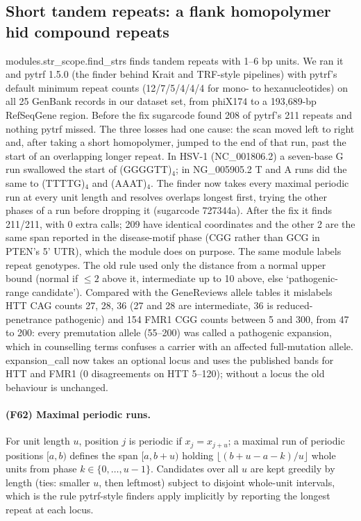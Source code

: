\subsection{Short tandem repeats: a flank homopolymer hid compound repeats}
modules.str\_scope.find\_strs finds tandem repeats with 1--6 bp units. We ran it and pytrf 1.5.0 (the finder behind Krait and TRF-style pipelines) with pytrf's default minimum repeat counts (12/7/5/4/4/4 for mono- to hexanucleotides) on all 25 GenBank records in our dataset set, from phiX174 to a 193,689-bp RefSeqGene region. Before the fix sugarcode found 208 of pytrf's 211 repeats and nothing pytrf missed. The three losses had one cause: the scan moved left to right and, after taking a short homopolymer, jumped to the end of that run, past the start of an overlapping longer repeat. In HSV-1 (NC\_001806.2) a seven-base G run swallowed the start of (GGGGTT)$_4$; in NG\_005905.2 T and A runs did the same to (TTTTG)$_4$ and (AAAT)$_4$. The finder now takes every maximal periodic run at every unit length and resolves overlaps longest first, trying the other phases of a run before dropping it (sugarcode 727344a). After the fix it finds 211/211, with 0 extra calls; 209 have identical coordinates and the other 2 are the same span reported in the disease-motif phase (CGG rather than GCG in PTEN's 5' UTR), which the module does on purpose.
The same module labels repeat genotypes. The old rule used only the distance from a normal upper bound (normal if $\le2$ above it, intermediate up to 10 above, else `pathogenic-range candidate'). Compared with the GeneReviews allele tables it mislabels HTT CAG counts 27, 28, 36 (27 and 28 are intermediate, 36 is reduced-penetrance pathogenic) and 154 FMR1 CGG counts between 5 and 300, from 47 to 200: every premutation allele (55--200) was called a pathogenic expansion, which in counselling terms confuses a carrier with an affected full-mutation allele. expansion\_call now takes an optional locus and uses the published bands for HTT and FMR1 (0 disagreements on HTT 5--120); without a locus the old behaviour is unchanged.
\paragraph{(F62) Maximal periodic runs.} For unit length $u$, position $j$ is periodic if $x_j=x_{j+u}$; a maximal run of periodic positions $[a,b)$ defines the span $[a,b+u)$ holding $\lfloor (b+u-a-k)/u\rfloor$ whole units from phase $k\in\{0,\dots,u-1\}$. Candidates over all $u$ are kept greedily by length (ties: smaller $u$, then leftmost) subject to disjoint whole-unit intervals, which is the rule pytrf-style finders apply implicitly by reporting the longest repeat at each locus.
